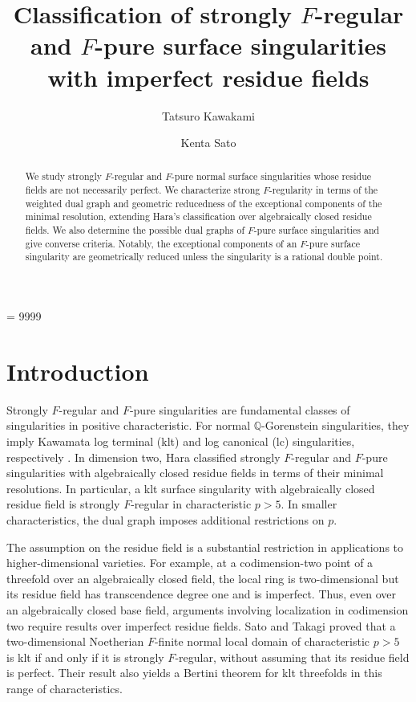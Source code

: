 \documentclass[12pt]{amsart}
\title{Classification of strongly $F$-regular and $F$-pure surface singularities with imperfect residue fields}
\author{Tatsuro Kawakami}
\author{Kenta Sato}
\newcommand{\Q}{\mathbb{Q}}
\theoremstyle{plain}
\theoremstyle{definition}
\theoremstyle{remark}
\newtheorem{defn and notation}[thm]{Definition and Notation}
\theoremstyle{plain}
\numberwithin{equation}{thm}
\begin{document}
\tolerance = 9999

\begin{abstract}
We study strongly $F$-regular and $F$-pure normal surface singularities whose residue fields are not necessarily perfect. 
We characterize strong $F$-regularity in terms of the weighted dual graph and geometric reducedness of the exceptional components of the minimal resolution, extending Hara's classification over algebraically closed residue fields. 
We also determine the possible dual graphs of $F$-pure surface singularities and give converse criteria. 
Notably, the exceptional components of an $F$-pure surface singularity are geometrically reduced unless the singularity is a rational double point. 
\end{abstract}

\maketitle
{}


\section{Introduction}\label{sec:introduction}

Strongly $F$-regular and $F$-pure singularities are fundamental classes of singularities in positive characteristic. For normal $\Q$-Gorenstein singularities, they imply Kawamata log terminal (klt) and log canonical (lc) singularities, respectively \cite{Hara-Watanabe}. In dimension two, Hara \cite{Hara(two-dim)} classified strongly $F$-regular and $F$-pure singularities with algebraically closed residue fields in terms of their minimal resolutions. In particular, a klt surface singularity with algebraically closed residue field is strongly $F$-regular in characteristic $p>5$. In smaller characteristics, the dual graph imposes additional restrictions on $p$.

The assumption on the residue field is a substantial restriction in applications to higher-dimensional varieties. For example, at a codimension-two point of a threefold over an algebraically closed field, the local ring is two-dimensional but its residue field has transcendence degree one and is imperfect. Thus, even over an algebraically closed base field, arguments involving localization in codimension two require results over imperfect residue fields. Sato and Takagi \cite{Sato-Takagi(generalhyperplane)} proved that a two-dimensional Noetherian $F$-finite normal local domain of characteristic $p>5$ is klt if and only if it is strongly $F$-regular, without assuming that its residue field is perfect. Their result also yields a Bertini theorem for klt threefolds in this range of characteristics.
\end{document}

